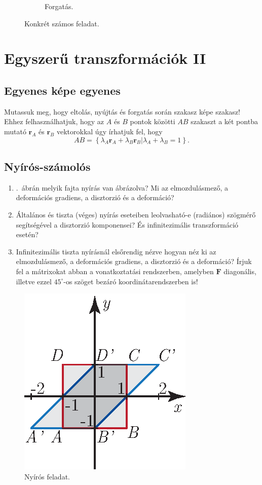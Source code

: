 \documentclass[12pt,a4paper]{scrartcl}
\let\mathbf\bm
\begin{document}
\begin{figure}[htb]
\begin{subfigure}[b]{0.45\textwidth}
\caption{Forgatás.}
\label{fig:forgatas_feladat}
\end{subfigure}
\label{fig:konret_szamos_feladat}
\caption{Konkrét számos feladat.}
\end{figure}
\FloatBarrier

\section{Egyszerű transzformációk II}
\subsection{Egyenes képe egyenes}
Mutassuk meg, hogy eltolás, nyújtás és forgatás során szakasz képe szakasz! Ehhez felhasználhatjuk, hogy az $A$ és $B$ pontok közötti $AB$ szakaszt a két pontba mutató ${{\mathbf{r}}_A}$ és ${{\mathbf{r}}_B}$ vektorokkal úgy írhatjuk fel, hogy 
\[AB = \left\{ {\left. {{\lambda _A}{{\mathbf{r}}_A} + {\lambda _B}{{\mathbf{r}}_B}} \right|{\lambda _A} + {\lambda _B} = 1} \right\}.\]

\subsection{Nyírós-számolós}
\begin{enumerate}
\item {}.\ ábrán melyik fajta nyírás van ábrázolva? Mi az elmozdulásmező, a deformációs gradiens, a disztorzió és a deformáció?
\item Általános és tiszta (véges) nyírás eseteiben leolvasható-e (radiános) szögmérő segítségével a disztorzió komponensei? És infinitezimális transzformáció esetén?
\item Infinitezimális tiszta nyírásnál elsőrendig nézve hogyan néz ki az elmozdulásmező, a deformációs gradiens, a disztorzió és a deformáció? Írjuk fel a mátrixokat abban a vonatkoztatási rendszerben, amelyben ${\mathbf{F}}$ diagonális, illetve ezzel $45^\circ$-os szöget bezáró koordinátarendszerben is!
\end{enumerate}


\begin{figure}[htb] 
\centering    
\includegraphics[scale=1]{figs/nyiras_feladat.eps}
\caption{Nyírós feladat.}
\label{fig:nyiras_feladat}
\end{figure}
\FloatBarrier
\end{document}
